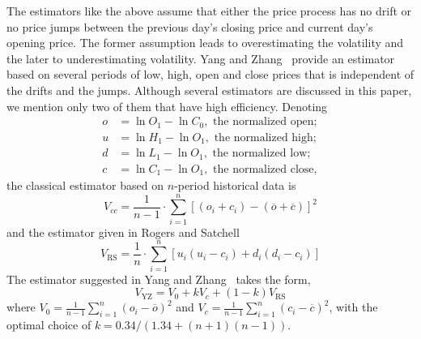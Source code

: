 The estimators like the above assume that either the price process has no drift or no price jumps between the previous day's closing price and current day's opening price. The former assumption leads to overestimating the volatility and the later to underestimating volatility. Yang and Zhang~\cite{yangzhang2000} provide an estimator based on several periods of low, high, open and close prices that is independent of the drifts and the jumps. Although several estimators are discussed in this paper, we mention only two of them that have high efficiency. Denoting
	\[
	\begin{split}
	o&= \ln O_1 - \ln C_0, \text{ the normalized open}; \\
	u&= \ln H_1 - \ln O_1, \text{ the normalized high}; \\
	d&= \ln L_1 - \ln O_1, \text{ the normalized low}; \\
	c&= \ln C_1 - \ln O_1,  \text{ the normalized close},
	\end{split}
	\]
the classical estimator based on $n$-period historical data is
	\begin{equation} \label{eqn:nperioddata}
	V_{cc}= \dfrac{1}{n-1} \cdot \sum_{i=1}^n [(o_i + c_i) - (\overline{o} + \overline{c})]^2
	\end{equation}
and the estimator given in Rogers and Satchell~\cite{rogerssatchell1991}
	\begin{equation} \label{eqn:rogerssatchell}
	V_{\text{RS}}= \dfrac{1}{n} \cdot \sum_{i=1}^n [u_i(u_i - c_i) + d_i(d_i-c_i)]
	\end{equation}
The estimator suggested in Yang and Zhang~\cite{yangzhang2000} takes the form,
	\begin{equation} \label{eqn:yang2000}
	V_{\text{YZ}}= V_0 + k V_c + (1-k)V_{\text{RS}}
	\end{equation}
where $V_0= \frac{1}{n-1} \sum_{i=1}^n (o_i - \overline{o})^2$ and $V_c= \frac{1}{n-1} \sum_{i=1}^n (c_i - \overline{c})^2$, with the optimal choice of $k= 0.34/(1.34 + (n+1)(n-1))$. \twomedskip


